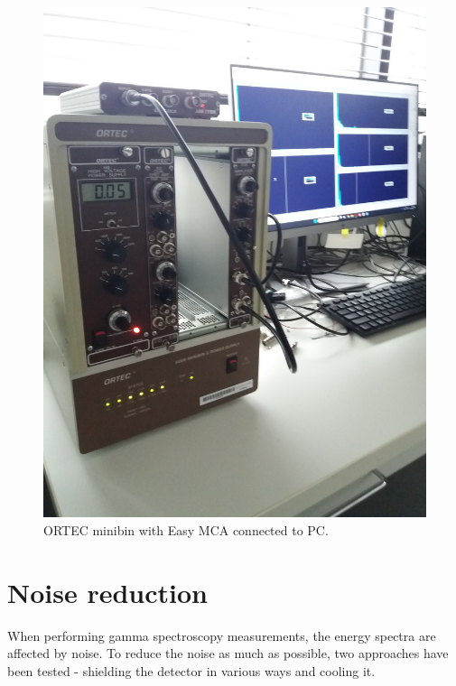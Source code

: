 \begin{figure}[H]
 \centering
 \includegraphics[scale=0.09, angle = 270]{./pictures/ORTECbin.jpg}
 \caption{ORTEC minibin with Easy MCA connected to PC.}
 \label{minibin}
 
\end{figure}


\section{Noise reduction}
When performing gamma spectroscopy measurements, the energy spectra are affected by noise. To reduce the noise as much as possible, two approaches have been tested - shielding the detector in various ways and cooling it.
